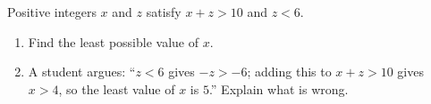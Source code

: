Positive integers $x$ and $z$ satisfy $x+z>10$ and $z<6$.
\begin{enumerate}
\item[(a)] Find the least possible value of $x$.
\item[(b)] A student argues: ``$z<6$ gives $-z>-6$; adding this to $x+z>10$ gives $x>4$, so the least value of $x$ is $5$.'' Explain what is wrong.
\end{enumerate}
